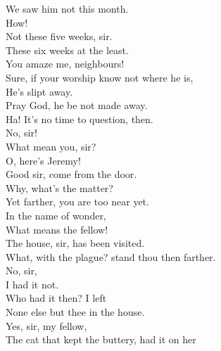 \documentclass[a4paper,oneside,12pt]{memoir}
\begin{document}
\begin{drama*}
We saw him not this month.\\
\lovewitspeaks {} How!\\
\neighthreespeaks {} Not these five weeks, sir.\\
\neightwospeaks These six weeks at the least.\\
\lovewitspeaks {} You amaze me, neighbours!\\
\neighonespeaks Sure, if your worship know not where he is,\\
He's slipt away.\\
\neighthreespeaks {} Pray God, he be not made away.\\
\lovewitspeaks Ha! It's no time to question, then.\\
\neightwospeaks {} No, sir!\\
\facespeaks What mean you, sir?\\
\neighonespeaks
\neightwospeaks
\neighthreespeaks {}  O, here's Jeremy!\\
\facespeaks Good sir, come from the door.\\
\lovewitspeaks {} Why, what's the matter?\\
\facespeaks Yet farther, you are too near yet.\\
\lovewitspeaks {} In the name of wonder,\\
What means the fellow!\\
\facespeaks {} The house, sir, has been visited.\\
\lovewitspeaks What, with the plague? stand thou then farther.\\
\facespeaks {} No, sir,\\
I had it not.\\
\lovewitspeaks {} Who had it then? I left\\
None else but thee in the house.\\
\facespeaks {} Yes, sir, my fellow,\\
The cat that kept the buttery, had it on her\\

\end{drama*}
\end{document}

